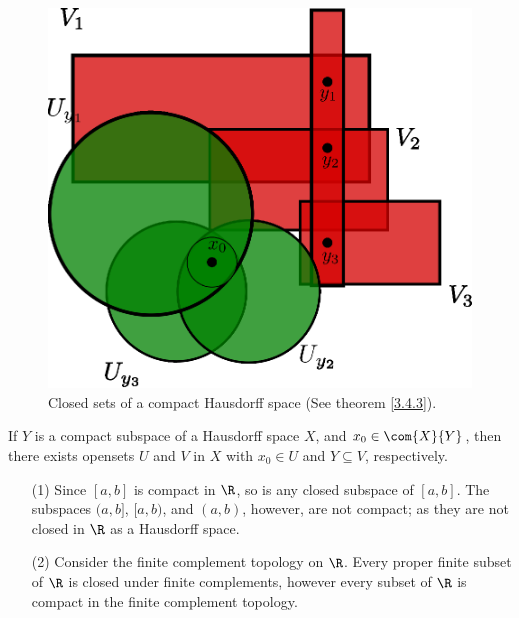 \begin{figure}[h]
    \centering
    \includegraphics[scale=0.5]{Figures/Chapter3/compact_hausdorf_space.eps}
    \caption{Closed sets of a compact Hausdorff space (See theorem \ref{3.4.3}).}
    \label{fig_3.1}
\end{figure}

\begin{corollary}
    If $Y$ is a compact subspace of a Hausdorff space $X$, and  $ x_0 \in \com{X}{Y}$, then there
    exists opensets $U$ and  $V$ in  $X$ with  $ x_0 \in U$ and $Y \subseteq V$, respectively.
\end{corollary}

\begin{example}
    \begin{enumerate}
        \item[(1)] Since $[a,b]$ is compact in $\R$, so is any closed subspace of  $[a,b]$. The
            subspaces $(a,b]$, $[a,b)$, and $(a,b)$, however, are not compact; as they are not
            closed in $\R$ as a Hausdorff space.

        \item [(2)] Consider the finite complement topology on $\R$. Every proper finite subset of
            $\R$ is closed under finite complements, however every subset of  $\R$ is compact in the
            finite complement topology.
    \end{enumerate}
\end{example}

